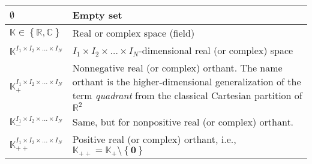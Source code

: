 \begin{xltabular}{\textwidth}{XX}
	\(\emptyset\)                                                                                                                                           & Empty set                                                                                                                                                                                                                                           \\ \hline
	\(\mathbb{K} \in \left\{ \mathbb{R}, \mathbb{C} \right\}\)                                                                                              & Real or complex space (field)                                                                                                                                                                                                                       \\ \hline
	\(\mathbb{K}^{I_1\times I_2 \times \dots \times I_N}\)                                                                                                  & \(I_1\times I_2 \times \dots \times I_N\)-dimensional real (or complex) space                                                                                                                                                                       \\ \hline
	\(\mathbb{K}_{+}^{I_1\times I_2 \times \dots \times I_N}\) \cite{boydConvexOptimization2004} \cite[sec. 2.1.3]{dattorroConvexOptimizationEuclidean2010} & Nonnegative real (or complex) orthant. The name orthant is the higher-dimensional generalization of the term \emph{quadrant} from the classical Cartesian partition of \(\mathbb{R}^{2}\) \cite[sec 2.1.3]{dattorroConvexOptimizationEuclidean2010} \\ \hline
	\(\mathbb{K}_{-}^{I_1\times I_2 \times \dots \times I_N}\) \cite{boydConvexOptimization2004} \cite[sec. 2.1.3]{dattorroConvexOptimizationEuclidean2010} & Same, but for nonpositive real (or complex) orthant.                                                                                                                                                                                                \\ \hline
	\(\mathbb{K}_{++}^{I_1\times I_2 \times \dots \times I_N}\)                                                                                             & Positive real (or complex) orthant, i.e., \(\mathbb{K}_{++} = \mathbb{K}_{+}\setminus\left\{ \mathbf{0} \right\}\) \cite{boydConvexOptimization2004}                                                                                                \\ \hline

\end{xltabular}
